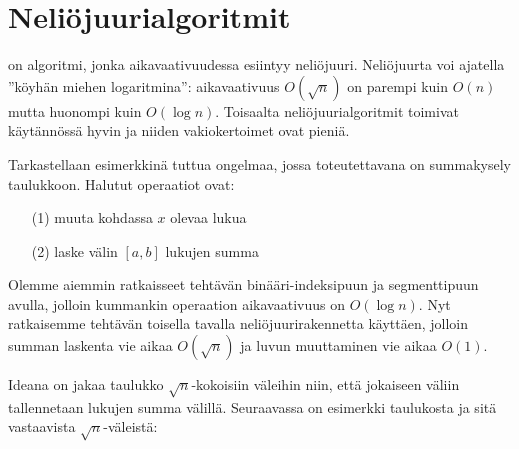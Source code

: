 \chapter{Neliöjuurialgoritmit}


 on algoritmi,
jonka aikavaativuudessa esiintyy neliöjuuri.
Neliöjuurta voi ajatella ''köyhän miehen logaritmina'':
aikavaativuus $O(\sqrt n)$ on parempi kuin $O(n)$
mutta huonompi kuin $O(\log n)$.
Toisaalta neliöjuurialgoritmit toimivat
käytännössä hyvin ja niiden vakiokertoimet ovat pieniä.

Tarkastellaan esimerkkinä tuttua ongelmaa,
jossa toteutettavana on summakysely taulukkoon.
Halutut operaatiot ovat:

\begin{enumerate}
\item[(1)] muuta kohdassa $x$ olevaa lukua
\item[(2)] laske välin $[a,b]$ lukujen summa
\end{enumerate}

Olemme aiemmin ratkaisseet tehtävän
binääri-indeksipuun ja segmenttipuun avulla,
jolloin kummankin operaation aikavaativuus on $O(\log n)$.
Nyt ratkaisemme tehtävän toisella
tavalla neliöjuurirakennetta käyttäen,
jolloin summan laskenta vie aikaa $O(\sqrt n)$
ja luvun muuttaminen vie aikaa $O(1)$.

Ideana on jakaa taulukko $\sqrt n$-kokoisiin
väleihin niin, että jokaiseen väliin
tallennetaan lukujen summa välillä.
Seuraavassa on esimerkki taulukosta ja
sitä vastaavista $\sqrt n$-väleistä:

\begin{center}
\end{center}

